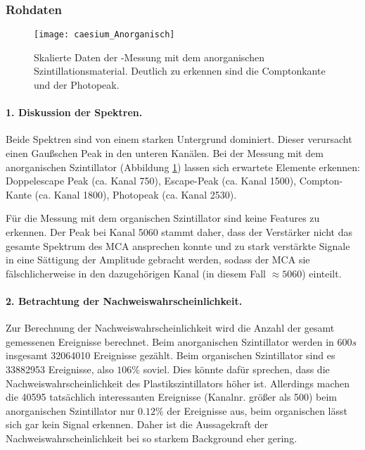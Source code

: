 \documentclass{../Misc/MontavonLaTeX/Montavon}
\newcommand{\fullwidth}{1.0\textwidth}
\begin{document}
\subsubsection{Rohdaten}
\begin{figure}[htbp]
\centering
\texttt{[image: caesium\_Anorganisch]}
\caption{Skalierte Daten der -Messung mit dem anorganischen Szintillationsmaterial. Deutlich zu erkennen sind die Comptonkante und der Photopeak.}
\label{fig:caesium_anorganisch}
\end{figure}

\paragraph{1. Diskussion der Spektren.} Beide Spektren sind von einem starken Untergrund dominiert. Dieser verursacht einen Gaußschen Peak in den unteren Kanälen. Bei der Messung mit dem anorganischen Szintillator (Abbildung \ref{fig:caesium_anorganisch}) lassen sich erwartete Elemente erkennen: Doppelescape Peak (ca. Kanal 750), Escape-Peak (ca. Kanal 1500), Compton-Kante (ca. Kanal 1800), Photopeak (ca. Kanal 2530).

Für die Messung mit dem organischen Szintillator sind keine Features zu erkennen. Der Peak bei Kanal 5060 stammt daher, dass der Verstärker nicht das gesamte Spektrum des MCA ansprechen konnte und zu stark verstärkte Signale in eine Sättigung der Amplitude gebracht werden, sodass der MCA sie fälschlicherweise in den dazugehörigen Kanal (in diesem Fall $\approx 5060$) einteilt.

\paragraph{2. Betrachtung der Nachweiswahrscheinlichkeit.} 
Zur Berechnung der Nachweiswahrscheinlichkeit wird die Anzahl der gesamt gemessenen Ereignisse berechnet. Beim anorganischen Szintillator werden in $600 \unit{s}$ insgesamt 32064010 Ereignisse gezählt. Beim organischen Szintillator sind es 33882953 Ereignisse, also $106 \unit{\%}$ soviel. Dies könnte dafür sprechen, dass die Nachweiswahrscheinlichkeit des Plastikszintillators höher ist. Allerdings machen die 40595 tatsächlich interessanten Ereignisse (Kanalnr. größer als 500) beim anorganischen Szintillator nur $0.12 \unit{\%}$ der Ereignisse aus, beim organischen lässt sich gar kein Signal erkennen. Daher ist die Aussagekraft der Nachweiswahrscheinlichkeit bei so starkem Background eher gering.
\end{document}

